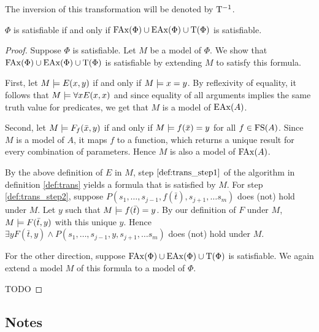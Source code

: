 The inversion of this transformation will be denoted by $\mathrm{T}^{-1}$.


\begin{prop}
	$\Phi$ is satisfiable if and only if $\mathrm{FAx}(\Phi) \cup \mathrm{EAx}(\Phi) \cup \mathrm{T}(\Phi)$ is satisfiable.
\end{prop}
\begin{proof}
	Suppose $\Phi$ is satisfiable.
	Let $M$ be a model of $\Phi$.
	We show that $\mathrm{FAx}(\Phi) \cup \mathrm{EAx}(\Phi) \cup \mathrm{T}(\Phi)$ is satisfiable by extending $M$ to satisfy this formula.

	First, let $M \models E(x, y)$ if and only if $M \models x = y$.
	By reflexivity of equality, it follows that $M \models \forall x E(x, x)$ and since equality of all arguments implies the same truth value for predicates, we get that $M$ is a model of $\mathrm{EAx}(A)$.

	Second, let $M \models F_f(\bar x, y)$ if and only if $M \models f(\bar x) = y$ for all $f \in \mathrm{FS}(A)$. 
	Since $M$ is a model of $A$, it maps $f$ to a function, which returns a unique result for every combination of parameters.
	Hence $M$ is also a model of $\mathrm{FAx}(A)$.

	By the above definition of $E$ in $M$, step $\ref{def:trans_step1}$ of the algorithm in definition \ref{def:trans} yields a formula that is satisfied by $M$.
	For step \ref{def:trans_step2}, suppose $P(s_1, \ldots, s_{j-1}, f(\bar t),\allowbreak s_{j+1}, \ldots s_m)$ does (not) hold under $M$.
	Let $y$ such that $M \models f(\bar t)=y$.
	By our definition of $F$ under $M$, $M\models F(\bar t, y)$ with this unique $y$.
	Hence $\exists y F(\bar t, y) \land P(s_1, \ldots, s_{j-1}, y, \allowbreak s_{j+1}, \ldots s_m)$ does (not) hold under $M$.


	For the other direction, suppose $\mathrm{FAx}(\Phi) \cup \mathrm{EAx}(\Phi) \cup \mathrm{T}(\Phi)$ is satisfiable. We again extend a model $M$ of this formula to a model of $\Phi$.

	TODO
\end{proof}




\subsection{Notes}


